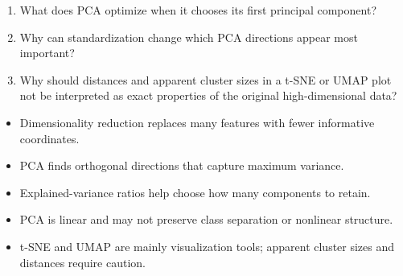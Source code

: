 

\begin{quickcheck}
\begin{enumerate}
  \item What does PCA optimize when it chooses its first principal component?
  \item Why can standardization change which PCA directions appear most important?
  \item Why should distances and apparent cluster sizes in a t-SNE or UMAP plot not be interpreted as exact properties of the original high-dimensional data?
\end{enumerate}
\end{quickcheck}

\begin{chapterrecap}
\begin{itemize}
  \item Dimensionality reduction replaces many features with fewer informative coordinates.
  \item PCA finds orthogonal directions that capture maximum variance.
  \item Explained-variance ratios help choose how many components to retain.
  \item PCA is linear and may not preserve class separation or nonlinear structure.
  \item t-SNE and UMAP are mainly visualization tools; apparent cluster sizes and distances require caution.
\end{itemize}
\end{chapterrecap}
